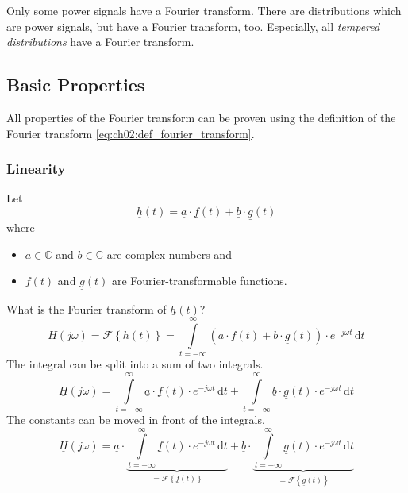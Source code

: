 \begin{refsection}
Only some power signals have a Fourier transform. There are distributions which are power signals, but have a Fourier transform, too. Especially, all \emph{tempered distributions} have a Fourier transform.

\subsection{Basic Properties}

All properties of the Fourier transform can be proven using the definition of the Fourier transform \eqref{eq:ch02:def_fourier_transform}.

\subsubsection{Linearity}

Let
\begin{equation}
	\underline{h}(t) = \underline{a} \cdot \underline{f}(t) + \underline{b} \cdot \underline{g}(t)
\end{equation}
where
\begin{itemize}
	\item $\underline{a} \in \mathbb{C}$ and $\underline{b} \in \mathbb{C}$ are complex numbers and
	\item $\underline{f}(t)$ and $\underline{g}(t)$ are Fourier-transformable functions.
\end{itemize}

What is the Fourier transform of $\underline{h}(t)$?
\begin{equation}
	\underline{H}(j \omega) = \mathcal{F} \left\{\underline{h}(t)\right\} = \int\limits_{t = -\infty}^{\infty} \left(\underline{a} \cdot \underline{f}(t) + \underline{b} \cdot \underline{g}(t)\right) \cdot e^{-j \omega t} \, \mathrm{d} t
\end{equation}
The integral can be split into a sum of two integrals.
\begin{equation}
	\underline{H}(j \omega) = \int\limits_{t = -\infty}^{\infty} \underline{a} \cdot \underline{f}(t) \cdot e^{-j \omega t} \, \mathrm{d} t + \int\limits_{t = -\infty}^{\infty} \underline{b} \cdot \underline{g}(t) \cdot e^{-j \omega t} \, \mathrm{d} t
\end{equation}
The constants can be moved in front of the integrals.
\begin{equation}
	\underline{H}(j \omega) = \underline{a} \cdot \underbrace{\int\limits_{t = -\infty}^{\infty} \underline{f}(t) \cdot e^{-j \omega t} \, \mathrm{d} t}_{= \mathcal{F}\left\{\underline{f}(t)\right\}} + \underline{b} \cdot \underbrace{\int\limits_{t = -\infty}^{\infty} \underline{g}(t) \cdot e^{-j \omega t} \, \mathrm{d} t}_{= \mathcal{F}\left\{\underline{g}(t)\right\}}
\end{equation}


\end{refsection}
